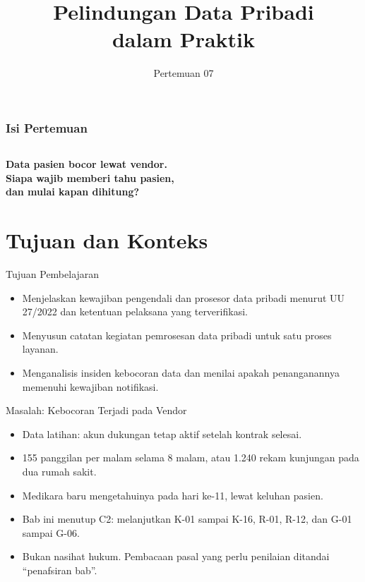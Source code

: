 \documentclass[aspectratio=169, table, 12pt]{beamer}
\title{\Huge Pelindungan Data Pribadi\\ \vspace{10pt} dalam Praktik}
\date{Pertemuan 07}
\begin{document}
\frame{\titlepage}

\begin{frame}
  \frametitle{Isi Pertemuan}
  \vspace{14pt}
  \begin{columns}[t]
    {\small\tableofcontents[sections={1-4}]}

    {\small\tableofcontents[sections={5-8}]}
  \end{columns}
\end{frame}

\begin{frame}{\hfill}
  \centering
  \Huge{\textbf{Data pasien bocor lewat vendor.\\Siapa wajib memberi tahu pasien,\\dan mulai kapan
  dihitung?}}
\end{frame}

\section{Tujuan dan Konteks}

\begin{frame}{{\Large Tujuan Pembelajaran}}
  \vspace{10pt}
  \begin{itemize}
    \item Menjelaskan kewajiban pengendali dan prosesor data pribadi menurut UU 27/2022 dan
          ketentuan pelaksana yang terverifikasi.
    \item Menyusun catatan kegiatan pemrosesan data pribadi untuk satu proses layanan.
    \item Menganalisis insiden kebocoran data dan menilai apakah penanganannya memenuhi kewajiban
          notifikasi.
  \end{itemize}
\end{frame}

\begin{frame}{{\Large Masalah: Kebocoran Terjadi pada Vendor}}
  \vspace{6pt}
  \small
  \begin{itemize}
    \item Data latihan: akun dukungan tetap aktif setelah kontrak selesai.
    \item 155 panggilan per malam selama 8 malam, atau 1.240 rekam kunjungan pada dua rumah sakit.
    \item Medikara baru mengetahuinya pada hari ke-11, lewat keluhan pasien.
    \item Bab ini menutup C2: melanjutkan K-01 sampai K-16, R-01, R-12, dan G-01 sampai G-06.
    \item Bukan nasihat hukum. Pembacaan pasal yang perlu penilaian ditandai ``penafsiran bab''.
  \end{itemize}
\end{frame}
\end{document}
